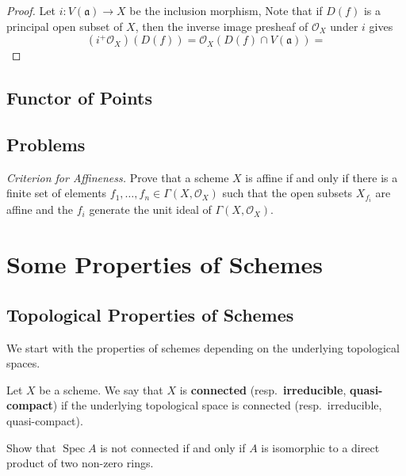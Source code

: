 \documentclass[12pt]{book}
\newcommand{\inlinedef}[1]{\textcolor{oxfordblue}{\bfseries #1}}
\theoremstyle{definition}
\DeclareMathOperator{\Spec}{Spec}
\begin{document}
	\begin{proof}
		
		
		Let $i \colon V(\mathfrak{a}) \to X$ be the inclusion morphism,  Note that if $D(f)$ is a principal open subset of $X$, then the inverse image presheaf of $\mathcal{O}_X$ under $i$ gives
		\begin{equation*}
			(i^{+}\mathcal{O}_X)(D(f)) = \mathcal{O}_X(D(f) \cap V(\mathfrak{a})) = 
		\end{equation*}
	\end{proof}
		
	\section{Functor of Points}	
	
	\section{Problems}
	
	\begin{problems}
		\item \textit{Criterion for Affineness.} Prove that a scheme $X$ is affine if and only if there is a finite set of elements $f_1, \dotsc, f_n \in \Gamma(X, \mathcal{O}_X)$ such that the open subsets $X_{f_i}$ are affine and the $f_i$ generate the unit ideal of $\Gamma(X, \mathcal{O}_X)$.
	\end{problems}
	
	\chapter{Some Properties of Schemes}
	
	\section{Topological Properties of Schemes}
	
	We start with the properties of schemes depending on the underlying topological spaces.
	
	\begin{definition}
		Let $X$ be a scheme. We say that $X$ is \inlinedef{connected} (resp.~\inlinedef{irreducible}, \inlinedef{quasi-compact}) if the underlying topological space is connected (resp.~irreducible, quasi-compact).
	\end{definition}
	
	\begin{exercise}
		Show that $\Spec A$ is not connected if and only if $A$ is isomorphic to a direct product of two non-zero rings.
	\end{exercise}
	
\end{document}
